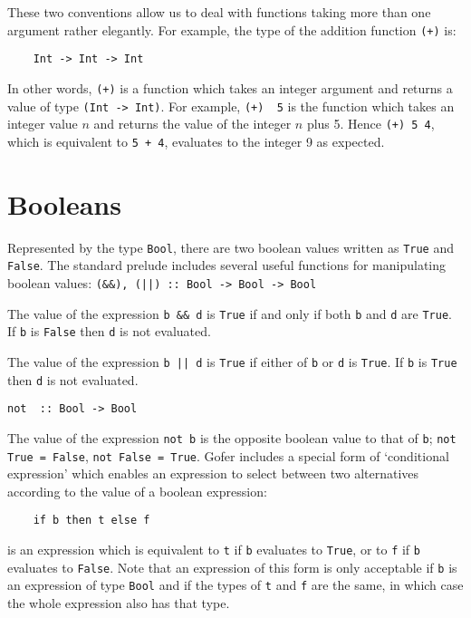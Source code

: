 These two conventions allow us to deal with functions taking more  than
one argument rather elegantly.  For example, the type of  the  addition
function \verb"(+)" is:
\begin{verbatim}
    Int -> Int -> Int
\end{verbatim}
In other words, \verb"(+)" is a function which takes an integer argument and
returns a value of type \verb"(Int -> Int)".  For  example,  
\verb"(+)  5"  is  the
function which takes an integer value $n$ and returns the  value  of  the
integer $n$ plus 5.  Hence \verb"(+) 5 4", which is equivalent  to  
\verb"5 + 4",
evaluates to the integer 9 as expected.


\section{Booleans}
Represented by the type \verb"Bool", there are two boolean values written as
\verb"True" and \verb"False". 
The  standard  prelude  includes  several  useful
functions for manipulating boolean values:
\BI
\IT    \verb"(&&), (||) :: Bool -> Bool -> Bool"

        The value of the expression \verb"b && d" is \verb"True"
        if and only if  both
        \verb"b" and \verb"d" are \verb"True".
        If \verb"b" is \verb"False" then \verb"d" is not evaluated.

        The value of the expression \verb"b || d" is \verb"True"
        if either of \verb"b" or  \verb"d"
        is \verb"True".  If \verb"b" is \verb"True" then \verb"d"
        is not evaluated.

\IT    \verb"not  :: Bool -> Bool"

        The value of the expression \verb"not b" is the opposite boolean value
        to that of \verb"b"; \verb"not True = False", \verb"not False = True".
\EI
Gofer includes a special form of `conditional expression' which enables
an expression to select between two alternatives according to the value
of a boolean expression:
\begin{verbatim}
    if b then t else f 
\end{verbatim}
is an expression which is equivalent to \verb"t" if \verb"b"
evaluates to \verb"True", or to
\verb"f" if \verb"b" evaluates to \verb"False".
Note that an expression  of  this  form  is
only acceptable if \verb"b" is an expression of type \verb"Bool"
and if the types  of
\verb"t" and \verb"f" are the same, 
in which case the whole expression also has  that
type.


